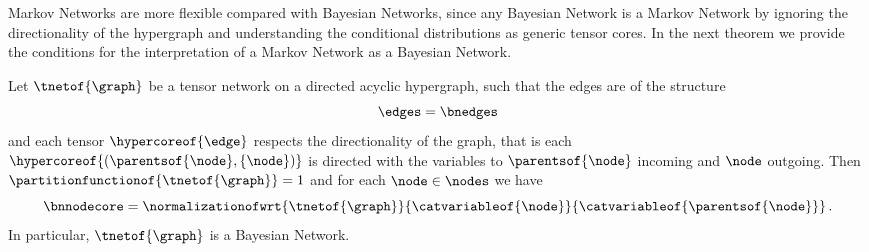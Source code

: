 
Markov Networks are more flexible compared with Bayesian Networks, since any Bayesian Network is a Markov Network by ignoring the directionality of the hypergraph and understanding the conditional distributions as generic tensor cores.
In the next theorem we provide the conditions for the interpretation of a Markov Network as a Bayesian Network.

\begin{theorem}
    \label{the:MarkovToBayesian}
    Let $\tnetof{\graph}$ be a tensor network on a directed acyclic hypergraph, such that the edges are of the structure
    \[ \edges = \bnedges \]
    and each tensor $\hypercoreof{\edge}$ respects the directionality of the graph, that is each $\hypercoreof{(\parentsof{\node}, \{\node\})}$ is directed with the variables to $\parentsof{\node}$ incoming and $\node$ outgoing.
    Then $\partitionfunctionof{\tnetof{\graph}}=1$ and for each $\node\in\nodes$ we have
    \[ \bnnodecore = \normalizationofwrt{\tnetof{\graph}}{\catvariableof{\node}}{\catvariableof{\parentsof{\node}}} \, . \]
    In particular, $\tnetof{\graph}$ is a Bayesian Network.
\end{theorem}

